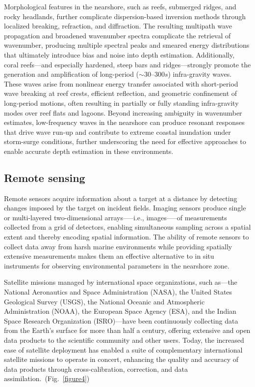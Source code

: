 \documentclass[12pt]{article}
\begin{document}
Morphological features in the nearshore, such as reefs, submerged ridges, and rocky headlands, further complicate dispersion-based inversion methods through localized breaking, refraction, and diffraction. The resulting multipath wave propagation and broadened wavenumber spectra complicate the retrieval of wavenumber, producing multiple spectral peaks and smeared energy distributions that ultimately introduce bias and noise into depth estimation. Additionally, coral reefs—and especially hardened, steep bars and ridges—strongly promote the generation and amplification of long-period ($\sim30 – 300 s$) infra-gravity waves. These waves arise from nonlinear energy transfer associated with short-period wave breaking at reef crests, efficient reflection, and geometric confinement of long-period motions, often resulting in partially or fully standing infra-gravity modes over reef flats and lagoons. Beyond increasing ambiguity in wavenumber estimates, low-frequency waves in the nearshore can produce resonant responses that drive wave run-up and contribute to extreme coastal inundation under storm-surge conditions, further underscoring the need for effective approaches to enable accurate depth estimation in these environments.~\cite{Cheriton2016, Storlazzi2003, Vetter2010, HolmanGuza1984, Elgar1994}

\subsection{Remote sensing}

Remote sensors acquire information about a target at a distance by detecting changes imposed by the target on incident fields. Imaging sensors produce single or multi-layered two-dimensional arrays—--i.e., images—--of measurements collected from a grid of detectors, enabling simultaneous sampling across a spatial extent and thereby encoding spatial information. The ability of remote sensors to collect data away from harsh marine environments while providing spatially extensive measurements makes them an effective alternative to in situ instruments for observing environmental parameters in the nearshore zone.~\cite{Vitousek2023, Holman2013}

Satellite missions managed by international space organizations, such as---the National Aeronautics and Space Administration (NASA), the United States Geological Survey (USGS), the National Oceanic and Atmospheric Administration (NOAA), the European Space Agency (ESA), and the Indian Space Research Organization (ISRO)---have been continuously collecting data from the Earth’s surface for more than half a century, offering extensive and open data products to the scientific community and other users. Today, the increased ease of satellite deployment has enabled a suite of complementary international satellite missions to operate in concert, enhancing the quality and accuracy of data products through cross-calibration, correction, and data assimilation.~(Fig.~\ref{figure4})
\end{document}

